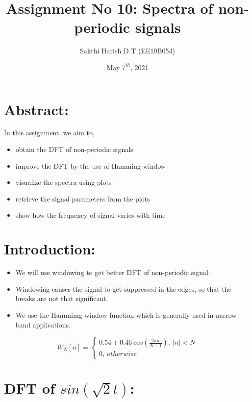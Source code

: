 \documentclass[11pt, a4paper]{article}
\title{Assignment No 10: Spectra of non-periodic signals}
\author{Sakthi Harish D T (EE19B054)}
\date{May $7^{th}$, 2021}
\begin{document}
		


\maketitle

\section*{Abstract:}
In this assignment, we aim to,
\begin{itemize}
    \item obtain the DFT of non-periodic signals
    \item improve the DFT by the use of Hamming window
    \item visualize the spectra using plots
    \item retrieve the signal parameters from the plots 
    \item show how the frequency of signal varies with time
\end{itemize}
\section{Introduction:}
\begin{itemize}
    \item We will use windowing to get better DFT of non-periodic signal.
    \item Windowing causes the signal to get suppressed in the edges, so that the breaks are not that significant.
    \item We use the Hammimg window function which is generally used in narrow-band applications.
\end{itemize}
    \begin{equation*}
        W_N[n] = \begin{cases}
                0.54 + 0.46\ cos(\frac{2\pi n}{N-1}),\  |n| < N\\
                0,\ otherwise
                \end{cases}
    \end{equation*}
    
\section{DFT of $sin(\sqrt{2}t)$:}
\end{document}
